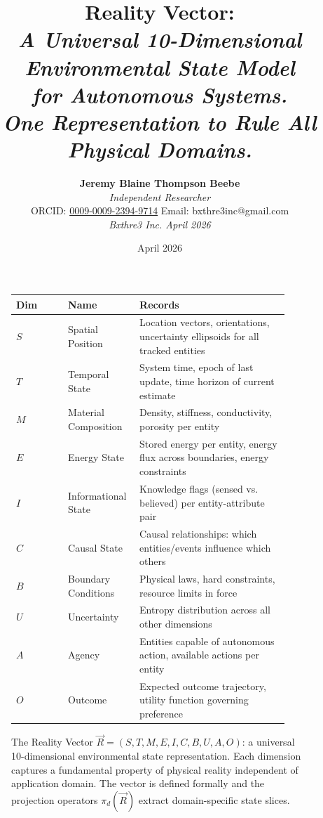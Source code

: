 \documentclass[12pt]{article}
\title{
    \vspace{1.2cm}
    {\LARGE \textbf{Reality Vector:}}\\[0.6em]
    {\large \textit{A Universal 10-Dimensional Environmental State Model}}\\[0.5em]
    {\normalsize \textit{for Autonomous Systems.}}\\[1.0em]
    {\small \textit{One Representation to Rule All Physical Domains.}}
}
\author{
    \textbf{Jeremy Blaine Thompson Beebe}\\[0.2em]
    \textit{Independent Researcher}\\[0.3em]
    ORCID: \href{https://orcid.org/0009-0009-2394-9714}{0009-0009-2394-9714} \quad Email: bxthre3inc@gmail.com\\[0.3em]
    \textit{Bxthre3 Inc. \hfill April 2026}\\[0.3em]
}
\date{April 2026}
\begin{document}
\maketitle

\begin{figure}[htbp]
\centering
\caption{The Reality Vector $\vec{R} = (S, T, M, E, I, C, B, U, A, O)$: a universal 10-dimensional environmental state representation. Each dimension captures a fundamental property of physical reality independent of application domain. The vector is defined formally and the projection operators $\pi_d(\vec{R})$ extract domain-specific state slices.}
\label{fig:reality-vector}
\begin{tabular}{p{0.18\linewidth}p{0.22\linewidth}p{0.52\linewidth}}
\toprule
\textbf{Dim} & \textbf{Name} & \textbf{Records} \\
\midrule
$S$ & Spatial Position & Location vectors, orientations, uncertainty ellipsoids for all tracked entities \\
$T$ & Temporal State & System time, epoch of last update, time horizon of current estimate \\
$M$ & Material Composition & Density, stiffness, conductivity, porosity per entity \\
$E$ & Energy State & Stored energy per entity, energy flux across boundaries, energy constraints \\
$I$ & Informational State & Knowledge flags (sensed vs. believed) per entity-attribute pair \\
$C$ & Causal State & Causal relationships: which entities/events influence which others \\
$B$ & Boundary Conditions & Physical laws, hard constraints, resource limits in force \\
$U$ & Uncertainty & Entropy distribution across all other dimensions \\
$A$ & Agency & Entities capable of autonomous action, available actions per entity \\
$O$ & Outcome & Expected outcome trajectory, utility function governing preference \\
\bottomrule
\end{tabular}
\end{figure}

\thispagestyle{fancy}
\end{document}
